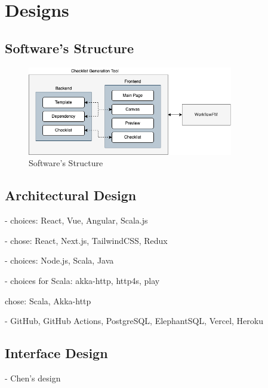 

\section{Designs}

\subsection{Software's Structure}
\begin{figure}[ht]
    \centering
    \includegraphics[width=0.8\textwidth]{overleaf/images/system_structure.png}
    \caption{Software's Structure}
    \label{fig:software_structure}
\end{figure}

\subsection{Architectural Design}
- choices: React, Vue, Angular, Scala.js

- chose: React, Next.js, TailwindCSS, Redux

- choices: Node.js, Scala, Java

- choices for Scala: akka-http, http4s, play

chose: Scala, Akka-http

- GitHub, GitHub Actions, PostgreSQL, ElephantSQL, Vercel, Heroku

\subsection{Interface Design}

- Chen's design \cite{checklistdesign}

